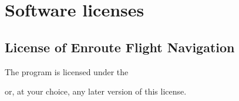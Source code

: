 \documentclass[letterpaper,10pt,english]{sphinxmanual}
\begin{document}
\chapter{Software licenses}
\label{\detokenize{04-appendix/licenses:software-licenses}}\label{\detokenize{04-appendix/licenses::doc}}

\section{License of Enroute Flight Navigation}
\label{\detokenize{04-appendix/licenses:license-of-enroute-flight-navigation}}
\sphinxAtStartPar
The program  is licensed under the %
\begin{footnote}[13]\sphinxAtStartFootnote
{}
%
\end{footnote} or,
at your choice, any later version of this license.
\end{document}
